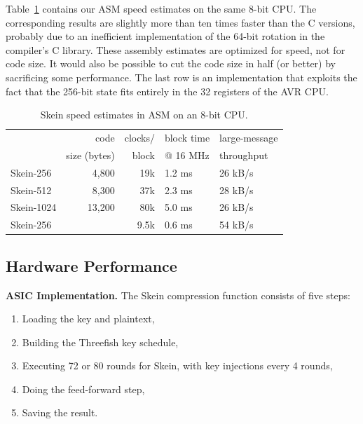 \documentclass[11pt,twoside]{article}
\begin{document}
Table~\ref{tab:SkeinASM8Speed} contains our ASM speed estimates on the same 8-bit CPU. The corresponding results are slightly more than ten times faster than the C versions, probably due to an inefficient implementation of the 64-bit rotation in the compiler's C library. These assembly estimates are optimized for speed, not for code size. It would also be possible to cut the code size in half (or better) by sacrificing some performance.  The last row is an implementation that exploits the fact that the 256-bit state fits entirely in the 32 registers of the AVR CPU.
%
\begin{table}[htb]
  \begin{center}
    \begin{tabular}{|l|rrll|}
    \hline
               & code         & clocks/ & block time & large-message \\
               & size (bytes) & block   & @ 16 MHz  & throughput \\
    \hline
    Skein-256  &  4,800 & 19k & 1.2 ms    &  26 kB/s \\
    Skein-512  &  8,300 & 37k & 2.3 ms    &  28 kB/s \\
    Skein-1024 & 13,200 & 80k & 5.0 ms    &  26 kB/s \\
    \hline
    Skein-256  &         & 9.5k& 0.6 ms & 54 kB/s \\
    \hline
    \end{tabular}
  \end{center}
  \caption{Skein speed estimates in ASM on an 8-bit CPU.}
  \label{tab:SkeinASM8Speed}
\end{table}

\subsection{Hardware Performance}

{\bf ASIC Implementation.}  The Skein compression function consists of five steps:

\begin{enumerate}
\item Loading the key and plaintext,
\item Building the Threefish key schedule,
\item Executing 72 or 80 rounds for Skein, with key injections every 4 rounds,
\item Doing the feed-forward step,
\item Saving the result.
\end{enumerate}
\end{document}
